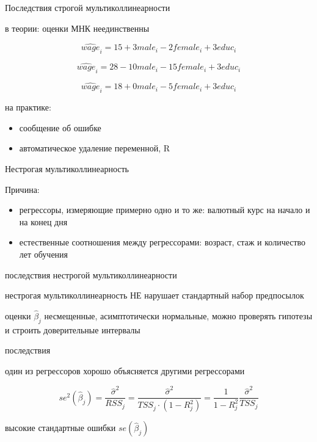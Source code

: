 \documentclass[ignorenonframetext,]{beamer}
\begin{document}
\begin{frame}{Последствия строгой мультиколлинеарности}

в теории: оценки МНК неединственны

\[
\widehat{wage}_i=15 + 3 male_i -2 female_i + 3 educ_i 
\]

\[
\widehat{wage}_i=28 -10 male_i -15 female_i + 3 educ_i 
\]

\[
\widehat{wage}_i=18 + 0 male_i -5 female_i + 3 educ_i 
\]

\end{frame}

\begin{frame}{на практике:}

\begin{itemize}
\itemsep1pt\parskip0pt
\item
  сообщение об ошибке
\item
  автоматическое удаление переменной, R
\end{itemize}

\end{frame}

\begin{frame}{Нестрогая мультиколлинеарность}

Причина:

\begin{itemize}
\itemsep1pt\parskip0pt
\item
  регрессоры, измеряющие примерно одно и то же: валютный курс на начало
  и на конец дня
\item
  естественные соотношения между регрессорами: возраст, стаж и
  количество лет обучения
\end{itemize}

\end{frame}

\begin{frame}{последствия нестрогой мультиколлинеарности}

нестрогая мультиколлинеарность НЕ нарушает стандартный набор предпосылок

оценки \(\hat{\beta}_j\) несмещенные, асимптотически нормальные, можно
проверять гипотезы и строить доверительные интервалы

\end{frame}

\begin{frame}{последствия}

один из регрессоров хорошо объясняется другими регрессорами

\[
se^2(\hat{\beta}_j)=\frac{\hat{\sigma}^2}{RSS_j}=\frac{\hat{\sigma}^2}{TSS_j\cdot (1-R^2_j)}=
\frac{1}{1-R^2_j}\frac{\hat{\sigma}^2}{TSS_j}
\]

высокие стандартные ошибки \(se(\hat{\beta}_j)\)

\end{frame}
\end{document}

